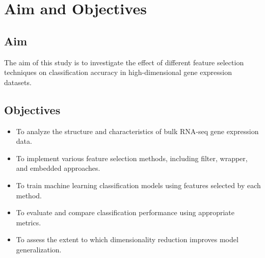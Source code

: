 \section{Aim and Objectives}

\subsection{Aim}

The aim of this study is to investigate the effect of different feature selection techniques on classification accuracy in high-dimensional gene expression datasets.

\subsection{Objectives}

\begin{itemize}
    \item To analyze the structure and characteristics of bulk RNA-seq gene expression data.
    \item To implement various feature selection methods, including filter, wrapper, and embedded approaches.
    \item To train machine learning classification models using features selected by each method.
    \item To evaluate and compare classification performance using appropriate metrics.
    \item To assess the extent to which dimensionality reduction improves model generalization.
\end{itemize}
